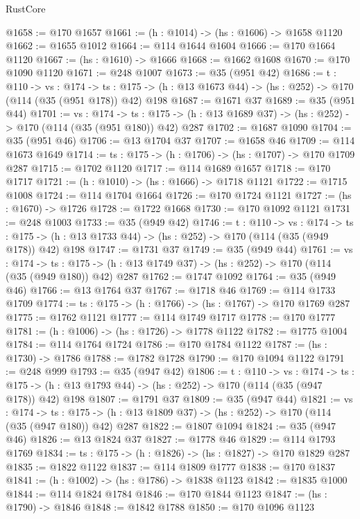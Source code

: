 \begin{lexlean}{RustCore}
\begin{coremodule}
@1658 := @170 @1657
@1661 := (h : @1014) -> (hs : @1606) -> @1658 @1120
@1662 := @1655 @1012
@1664 := @114 @1644 @1604
@1666 := @170 @1664 @1120
@1667 := (hs : @1610) -> @1666
@1668 := @1662 @1608
@1670 := @170 @1090 @1120
@1671 := @248 @1007
@1673 := @35 (@951 @42)
@1686 := {t : @110} ->
  {vs : @174} ->
  {ts : @175} -> (h : @13 @1673 @44) -> (hs : @252) -> @170 (@114 (@35 (@951 @178)) @42) @198
@1687 := @1671 @37
@1689 := @35 (@951 @44)
@1701 := {vs : @174} ->
  {ts : @175} -> (h : @13 @1689 @37) -> (hs : @252) -> @170 (@114 (@35 (@951 @180)) @42) @287
@1702 := @1687 @1090
@1704 := @35 (@951 @46)
@1706 := @13 @1704 @37
@1707 := @1658 @46
@1709 := @114 @1673 @1649
@1714 := {ts : @175} -> (h : @1706) -> (hs : @1707) -> @170 @1709 @287
@1715 := @1702 @1120
@1717 := @114 @1689 @1657
@1718 := @170 @1717
@1721 := (h : @1010) -> (hs : @1666) -> @1718 @1121
@1722 := @1715 @1008
@1724 := @114 @1704 @1664
@1726 := @170 @1724 @1121
@1727 := (hs : @1670) -> @1726
@1728 := @1722 @1668
@1730 := @170 @1092 @1121
@1731 := @248 @1003
@1733 := @35 (@949 @42)
@1746 := {t : @110} ->
  {vs : @174} ->
  {ts : @175} -> (h : @13 @1733 @44) -> (hs : @252) -> @170 (@114 (@35 (@949 @178)) @42) @198
@1747 := @1731 @37
@1749 := @35 (@949 @44)
@1761 := {vs : @174} ->
  {ts : @175} -> (h : @13 @1749 @37) -> (hs : @252) -> @170 (@114 (@35 (@949 @180)) @42) @287
@1762 := @1747 @1092
@1764 := @35 (@949 @46)
@1766 := @13 @1764 @37
@1767 := @1718 @46
@1769 := @114 @1733 @1709
@1774 := {ts : @175} -> (h : @1766) -> (hs : @1767) -> @170 @1769 @287
@1775 := @1762 @1121
@1777 := @114 @1749 @1717
@1778 := @170 @1777
@1781 := (h : @1006) -> (hs : @1726) -> @1778 @1122
@1782 := @1775 @1004
@1784 := @114 @1764 @1724
@1786 := @170 @1784 @1122
@1787 := (hs : @1730) -> @1786
@1788 := @1782 @1728
@1790 := @170 @1094 @1122
@1791 := @248 @999
@1793 := @35 (@947 @42)
@1806 := {t : @110} ->
  {vs : @174} ->
  {ts : @175} -> (h : @13 @1793 @44) -> (hs : @252) -> @170 (@114 (@35 (@947 @178)) @42) @198
@1807 := @1791 @37
@1809 := @35 (@947 @44)
@1821 := {vs : @174} ->
  {ts : @175} -> (h : @13 @1809 @37) -> (hs : @252) -> @170 (@114 (@35 (@947 @180)) @42) @287
@1822 := @1807 @1094
@1824 := @35 (@947 @46)
@1826 := @13 @1824 @37
@1827 := @1778 @46
@1829 := @114 @1793 @1769
@1834 := {ts : @175} -> (h : @1826) -> (hs : @1827) -> @170 @1829 @287
@1835 := @1822 @1122
@1837 := @114 @1809 @1777
@1838 := @170 @1837
@1841 := (h : @1002) -> (hs : @1786) -> @1838 @1123
@1842 := @1835 @1000
@1844 := @114 @1824 @1784
@1846 := @170 @1844 @1123
@1847 := (hs : @1790) -> @1846
@1848 := @1842 @1788
@1850 := @170 @1096 @1123

\end{coremodule}
\end{lexlean}
